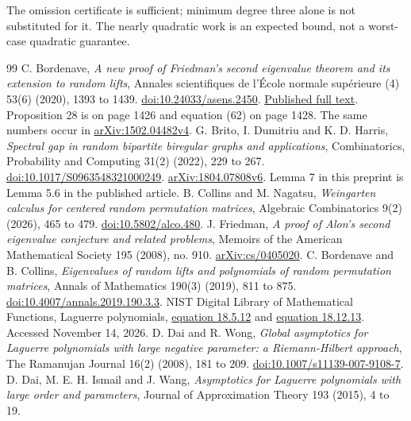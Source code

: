 \documentclass[11pt]{article}
\theoremstyle{definition}
\theoremstyle{remark}
\newcommand{\1}{\mathbf 1}
\begin{document}
The omission certificate is sufficient; minimum degree three alone is
not substituted for it. The nearly quadratic work is an expected bound,
not a worst-case quadratic guarantee.


\clearpage
\clearpage
\begin{thebibliography}{99}
C. Bordenave, \emph{A new proof of Friedman's second eigenvalue theorem and its extension to random lifts}, Annales scientifiques de l'\'Ecole normale sup\'erieure (4) 53(6) (2020), 1393 to 1439.
\href{https://doi.org/10.24033/asens.2450}{doi:10.24033/asens.2450}.
\href{https://smf.emath.fr/download/pdf/1498332}{Published full text}. Proposition 28 is on page 1426 and equation (62) on page 1428. The same numbers occur in \href{https://arxiv.org/abs/1502.04482v4}{arXiv:1502.04482v4}.
G. Brito, I. Dumitriu and K. D. Harris, \emph{Spectral gap in random bipartite biregular graphs and applications}, Combinatorics, Probability and Computing 31(2) (2022), 229 to 267.
\href{https://doi.org/10.1017/S0963548321000249}{doi:10.1017/S0963548321000249}.
\href{https://arxiv.org/abs/1804.07808v6}{arXiv:1804.07808v6}. Lemma 7 in this preprint is Lemma 5.6 in the published article.
B. Collins and M. Nagatsu, \emph{Weingarten calculus for centered random permutation matrices}, Algebraic Combinatorics 9(2) (2026), 465 to 479.
\href{https://doi.org/10.5802/alco.480}{doi:10.5802/alco.480}.
J. Friedman, \emph{A proof of Alon's second eigenvalue conjecture and related problems}, Memoirs of the American Mathematical Society 195 (2008), no. 910.
\href{https://arxiv.org/abs/cs/0405020}{arXiv:cs/0405020}.
C. Bordenave and B. Collins, \emph{Eigenvalues of random lifts and polynomials of random permutation matrices}, Annals of Mathematics 190(3) (2019), 811 to 875.
\href{https://doi.org/10.4007/annals.2019.190.3.3}{doi:10.4007/annals.2019.190.3.3}.
NIST Digital Library of Mathematical Functions, Laguerre polynomials,
\href{https://dlmf.nist.gov/18.5.E12}{equation 18.5.12} and
\href{https://dlmf.nist.gov/18.12.E13}{equation 18.12.13}. Accessed November 14, 2026.
D. Dai and R. Wong, \emph{Global asymptotics for Laguerre polynomials with large negative parameter: a Riemann-Hilbert approach}, The Ramanujan Journal 16(2) (2008), 181 to 209.
\href{https://doi.org/10.1007/s11139-007-9108-7}{doi:10.1007/s11139-007-9108-7}.
D. Dai, M. E. H. Ismail and J. Wang, \emph{Asymptotics for Laguerre polynomials with large order and parameters}, Journal of Approximation Theory 193 (2015), 4 to 19.

\end{thebibliography}
\end{document}
